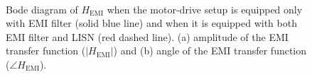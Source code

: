 \documentclass[journal,a4paper,10pt,twoside]{IEEEtran} %
\begin{document}
	\begin{figure}[t]
	    \begin{center}
	                \\
	                \vspace{-3mm}
	    \end{center}
	    \vspace{-3mm}
		\caption{Bode diagram of $H_\mathrm{EMI}$ when the motor-drive setup is equipped only with EMI filter (solid blue line) and when it is equipped with both EMI filter and LISN (red dashed line). (a) amplitude of the EMI transfer function ($|\textit{H}_{\textrm{EMI}}|$) and (b) angle of the EMI transfer function ($\angle \textit{H}_{\textrm{EMI}}$).}
		\label{FIG9}
	\end{figure}
	
\end{document}
